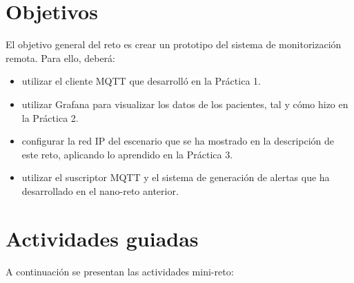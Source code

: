 \documentclass{upmassignment} \usepackage[spanish]{babel} \usepackage{ifthen} \usepackage{amsmath} \usepackage{amsfonts} \usepackage{booktabs}
\begin{document}
\begin{figure}[h]
\end{figure}



\section*{Objetivos}
El objetivo general del reto es crear un prototipo del sistema de monitorización remota. Para ello, deberá: 
\begin{itemize}
    \item utilizar el cliente MQTT que desarrolló en la Práctica 1.
    \item utilizar Grafana para visualizar los datos de los pacientes, tal y cómo hizo en la Práctica 2.  
    \item configurar la red IP del escenario  que se ha mostrado en la descripción de este reto, aplicando lo aprendido en la Práctica 3.
    \item utilizar el suscriptor MQTT y el sistema de generación de alertas que ha desarrollado en el nano-reto anterior.
\end{itemize}


    \section*{Actividades guiadas}
A continuación se presentan las actividades mini-reto:
\end{document}
